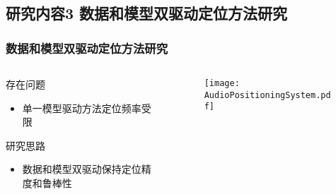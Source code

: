 

\subsection{研究内容3 数据和模型双驱动定位方法研究}

\begin{frame}[t]
	\frametitle{数据和模型双驱动定位方法研究}	
	\begin{columns}[t]
		\begin{column}{0.5\textwidth}
		    \begin{block}{存在问题}
		    {
		    	\small
		        \begin{itemize}
					\item 单一模型驱动方法定位频率受限
		        \end{itemize}
    		 } 
			\end{block}
			\begin{block}{研究思路}
			 {
 		    	\small
				\begin{itemize}
					\item 数据和模型双驱动保持定位精度和鲁棒性
				\end{itemize}
			}
			\end{block}
		\end{column}   
		\begin{column}{0.5\textwidth}
		   	\begin{figure}
		   	\centering
		   	    \texttt{[image: AudioPositioningSystem.pdf]}
		   	\end{figure}
		\end{column}
	\end{columns}
\end{frame}

